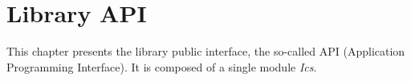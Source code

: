 
\newpage
\section*{Library API}

\ocwsection\label{api}
This chapter presents the library public interface, the so-called API
(Application Programming Interface). It is composed of a single module
\textit{Ics}.  
